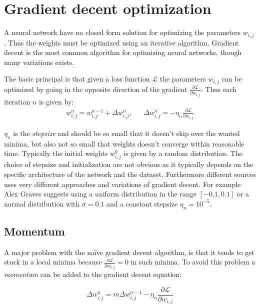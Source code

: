 \section{Gradient decent optimization}

A neural network have no closed form solution for optimizing the parameters $w_{i,j}$. Thus the weights must be optimized using an iterative algorithm. Gradient decent is the most common algorithm for optimizing neural networks, though many variations exists.

The basic principal is that given a loss function $\mathcal{L}$ the parameters $w_{i,j}$ can be optimized by going in the opposite direction of the gradient $\frac{\partial \mathcal{L}}{\partial w_{i,j}}$. Thus each iteration $n$ is given by:
\begin{equation}
\begin{aligned}
w_{i,j}^n = w_{i,j}^{n-1} + \Delta w_{i,j}^n, && \Delta w_{i,j}^n = - \eta_n \frac{\partial \mathcal{L}}{\partial w_{i,j}}
\end{aligned}
\end{equation}

$\eta_n$ is the \textit{stepsize} and should be so small that it doesn't skip over the wanted minima, but also not so small that weights doesn't converge within reasonable time. Typically the initial weights $w^0_{i,j}$ is given by a random distribution. The choice of stepsize and initialization are not obvious as it typically depends on the specific architecture of the network and the dataset. Furthermore different sources uses very different approaches and variations of gradient decent. For example Alex Graves \cite{alexgraves} suggests using a uniform distribution in the range $[-0.1, 0.1]$ or a normal distribution with $\sigma = 0.1$ and a constant stepsize $\eta_n = 10^{-5}$.

\subsection{Momentum}

A major problem with the naïve gradient decent algorithm, is that it tends to get stuck in a local minima because $\frac{\partial \mathcal{L}}{\partial w_{i,j}} = 0$ in such minima. To avoid this problem a \textit{momentum} can be added to the gradient decent equation:

\begin{equation}
\Delta w_{i,j}^n = m \Delta w_{i,j}^{n-1} - \eta_n \frac{\partial \mathcal{L}}{\partial w_{i,j}}
\end{equation}

